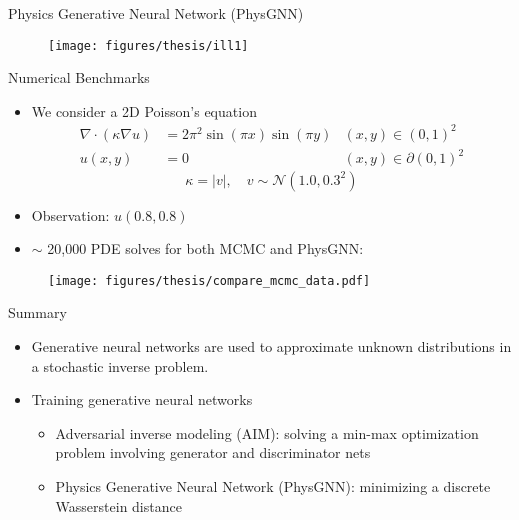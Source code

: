 \documentclass[usenames,dvipsnames]{beamer}
\begin{document}
\begin{frame}{Physics Generative Neural Network (PhysGNN)}
	\begin{figure}[htbp]
	\centering
	\texttt{[image: figures/thesis/ill1]}
\end{figure}
\end{frame}

\begin{frame}{Numerical Benchmarks}
	
	\begin{itemize}
		\item We consider a 2D Poisson's equation
\begin{equation*}
	\begin{aligned}
		\nabla \cdot (\kappa\nabla u) &= 2\pi^2\sin(\pi x) \sin(\pi y) & (x,y)\in (0,1)^2\\
		u(x,y) &= 0 & (x,y)\in \partial (0,1)^2 
	\end{aligned}
\end{equation*}
$$\kappa = |v|, \quad v \sim \mathcal{N}(1.0, 0.3^2)$$
\item Observation:  $u(0.8,0.8)$
\item $\sim$ 20,000 PDE solves for both MCMC and PhysGNN:
	\end{itemize}


\begin{figure}[hbt]
	\centering
    \texttt{[image: figures/thesis/compare\_mcmc\_data.pdf]}
\end{figure}

\end{frame}

\begin{frame}{Summary}
	\begin{itemize}
		\item Generative neural networks are used to approximate unknown distributions in a stochastic inverse problem. 
		\item Training generative neural networks
		\begin{itemize}
			\item Adversarial inverse modeling (AIM): solving a min-max optimization problem involving  generator and discriminator nets
			\item Physics Generative Neural Network (PhysGNN): minimizing a discrete Wasserstein distance
		\end{itemize}
	\end{itemize}
	
\end{frame}
\end{document}
